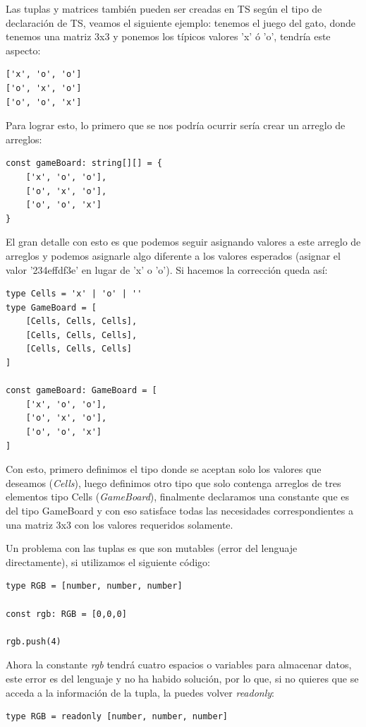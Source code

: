 Las tuplas y matrices también pueden ser creadas en TS según el tipo de declaración de TS, veamos el siguiente ejemplo: tenemos el juego del gato, donde tenemos una matriz 3x3 y ponemos los típicos valores 'x' ó 'o', tendría este aspecto:
\begin{lstlisting}
['x', 'o', 'o']
['o', 'x', 'o']
['o', 'o', 'x']
\end{lstlisting}

Para lograr esto, lo primero que se nos podría ocurrir sería crear un arreglo de arreglos:
\begin{lstlisting}
const gameBoard: string[][] = {
    ['x', 'o', 'o'],
    ['o', 'x', 'o'],
    ['o', 'o', 'x']
}
\end{lstlisting}

El gran detalle con esto es que podemos seguir asignando valores a este arreglo de arreglos y podemos asignarle algo diferente a los valores esperados (asignar el valor '234effdf3e' en lugar de 'x' o 'o'). Si hacemos la corrección queda así:
\begin{lstlisting}
type Cells = 'x' | 'o' | ''
type GameBoard = [
    [Cells, Cells, Cells],
    [Cells, Cells, Cells],
    [Cells, Cells, Cells]
]

const gameBoard: GameBoard = [
    ['x', 'o', 'o'],
    ['o', 'x', 'o'],
    ['o', 'o', 'x']
]
\end{lstlisting}

Con esto, primero definimos el tipo donde se aceptan solo los valores que deseamos (\textit{Cells}), luego definimos otro tipo que solo contenga arreglos de tres elementos tipo Cells (\textit{GameBoard}), finalmente declaramos una constante que es del tipo GameBoard y con eso satisface todas las necesidades correspondientes a una matriz 3x3 con los valores requeridos solamente.

Un problema con las tuplas es que son mutables (error del lenguaje directamente), si utilizamos el siguiente código:
\begin{lstlisting}
type RGB = [number, number, number]

const rgb: RGB = [0,0,0]

rgb.push(4)
\end{lstlisting}

Ahora la constante \textit{rgb} tendrá cuatro espacios o variables para almacenar datos, este error es del lenguaje y no ha habido solución, por lo que, si no quieres que se acceda a la información de la tupla, la puedes volver \textit{readonly}:
\begin{lstlisting}
type RGB = readonly [number, number, number]
\end{lstlisting}


